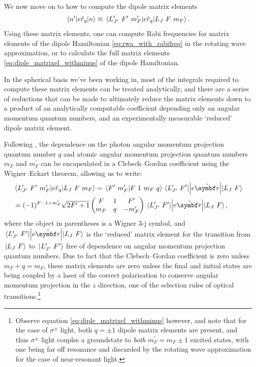 We now move on to how to compute the dipole matrix elements
\begin{align}
\matrixel{n^\prime}{e\hat r_q}{n} \equiv \matrixel{L^\prime_{J^\prime}\ F^\prime\ m_F^\prime}{e\hat r_q}{L_J\ F\ m_F}.
\end{align}
Using these matrix elements, one can compute Rabi frequencies for matrix elements of the dipole Hamiltonian \eqref{eq:rwa_with_rabifreq} in the rotating wave approximation, or to calculate the full matrix elements \eqref{eq:diple_matrixel_withminus} of the dipole Hamiltonian.

In the spherical basis we've been working in, most of the integrals required to compute these matrix elements can be treated analytically, and there are a series of reductions that can be made to ultimately reduce the matrix elements down to a product of an analytically computable coefficient depending only an angular momentum quantum numbers, and an experimentally measurable `reduced' dipole matrix element.

Following \cite{steck_rubidium_2015}, the dependence on the photon angular momentum projection quantum number $q$ and atomic angular momentum projection quantum numbers $m_F$ and $m_F^\prime$ can be encapsulated in a Clebsch--Gordan coefficient using the Wigner--Eckart theorem, allowing us to write:
\begin{align}
& \matrixel{L^\prime_{J^\prime}\ F^\prime\ m_F^\prime}{e\hat r_q}{L_J\ F\ m_F} = 
\braket{F^\prime\ m_F^\prime}{F\ 1\ m_F\ q}
\matrixel{L^\prime_{J^\prime}\ F^\prime}{\left|e\hat{\vec r}\right|}{L_J\ F}\\
&=
(-1)^{F - 1 + m_F^\prime}\sqrt{2F^\prime + 1}
\left(\begin{matrix}
F & 1 & F^\prime\\
m_F & q & -m_F^\prime\\
\end{matrix}\right)
\matrixel{L^\prime_{J^\prime}\ F^\prime}{\left|e\hat{\vec r}\right|}{L_J\ F},
\end{align}
where the object in parentheses is a Wigner $3$-j symbol, and $\matrixel{L^\prime_{J^\prime}\ F^\prime}{\left|e\hat{\vec r}\right|}{L_J\ F}$ is the `reduced' matrix element for the transition from $\ket{L_J\ F}$ to $\ket{L^\prime_{J^\prime}\ F^\prime}$ free of dependence on angular momentum projection quantum numbers. Due to fact that the Clebsch--Gordan coefficient is zero unless $m_F + q = m_F$, these matrix elements are zero unless the final and initial states are being coupled by a laser of the correct polarisation to conserve angular momentum projection in the $z$ direction, one of the selection rules of optical transitions.\footnote{Observe equation \eqref{eq:diple_matrixel_withminus} however, and note that for the case of $\sigma^\pm$ light, both $q=\pm 1$ dipole matrix elements are present, and thus $\sigma^\pm$ light couples a groundstate to \emph{both} $m_F^\prime = m_F \pm 1$ excited states, with one being far off resonance and discarded by the rotating wave approximation for the case of near-resonant light.}


